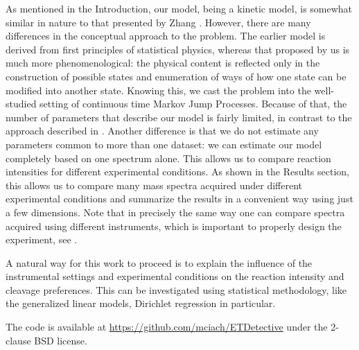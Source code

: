 \documentclass{llncs}
\begin{document}
As mentioned in the Introduction, our model, being a kinetic model, is somewhat similar in nature to that presented by Zhang \cite{Zhang2010-fp}. However, there are many differences in the conceptual approach to the problem. The earlier model is derived from first principles of statistical physics, whereas that proposed by us is much more phenomenological: the physical content is reflected only in the construction of possible states and enumeration of ways of how one state can be modified into another state. Knowing this, we cast the problem into the well-studied setting of continuous time Markov Jump Processes. Because of that, the number of parameters that describe our model is fairly limited, in contrast to the approach described in  \cite{Zhang2010-fp}. Another difference is that we do not estimate any parameters common to more than one dataset: we can estimate our model completely based on one spectrum alone. This allows us to compare reaction intensities for different experimental conditions. As shown in the Results section, this allows us to compare many mass spectra acquired under different experimental conditions and summarize the results in a convenient way using just a few dimensions. Note that in precisely the same way one can compare spectra acquired using  different instruments, which is important to properly design the experiment, see \cite{Lermyte2015-lm}.

A natural way for this work to proceed is to explain the influence of the instrumental settings and experimental conditions on the reaction intensity and cleavage preferences. This can be investigated using statistical methodology, like the generalized linear models, Dirichlet regression in particular.

The code is available at \url{https://github.com/mciach/ETDetective} under the 2-clause BSD license.\\

\end{document}
